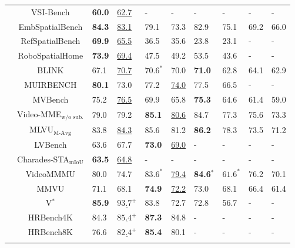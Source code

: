 {\begin{table}[htp]
\begin{adjustbox}{max width=1\textwidth}
\begin{NiceTabular}{c|c|w{c}{1cm}w{c}{1cm}|w{c}{1cm}w{c}{1cm}|w{c}{1cm}w{c}{1cm}|w{c}{1cm}w{c}{1cm}}
&VSI-Bench  & \textbf{60.0} & \underline{62.7} & - & - & - & - & - & - \\
&EmbSpatialBench & \textbf{84.3} & \underline{83.1} & 79.1 & 73.3 & 82.9 & 75.1 & 69.2 & 66.0 \\
&RefSpatialBench & \textbf{69.9} & \underline{65.5} & 36.5 & 35.6 & 23.8 & 23.1 &  -   &  -   \\
&RoboSpatialHome & \textbf{73.9} & \underline{69.4} & 47.5 & 49.2 & 53.5 & 43.6 &  -   &  -   \\
\midrule
{}
&BLINK & 67.1 & \underline{70.7} &  $70.6^*$ & 70.0 & \textbf{71.0} & 62.8 &  64.1   &  62.9   \\  
&MUIRBENCH & \textbf{80.1} & 73.0 &  77.2 & \underline{74.0} & 77.5 & 66.5 &  -   &  -   \\  
\midrule
{}
&MVBench                        & 75.2 & \underline{76.5} & 69.9 & 65.8 & \textbf{75.3} & 64.6 & 61.4 & 59.0 \\
&Video-MME$_{\text{w/o sub.}}$  & 79.0 & 79.2 & \textbf{85.1} & \underline{80.6} & 84.7 & 77.3 & 75.6 & 73.3 \\
&MLVU$_{\text{M-Avg}}$          & 83.8 & \underline{84.3} & 85.6 & 81.2 & \textbf{86.2} & 78.3 & 73.5 & 71.2 \\
&LVBench                        & 63.6 & 67.7 & \textbf{73.0} & \underline{69.0} &  -   &  -   &  -   &  -   \\
&Charades-STA$_{\text{mIoU}}$   & \textbf{63.5} & \underline{64.8} &  -   &   -  &  -   &  -   &  -   &  -   \\
&VideoMMMU                      & 80.0 & 74.7 & $83.6^*$ & \underline{79.4} & \textbf{84.6}$^*$ & $61.6^*$ & 76.2 & 70.1 \\
&MMVU                      & 71.1 & 68.1 & \textbf{74.9} & \underline{72.2} & 73.0 & 68.1 & 66.4 & 61.4 \\
\midrule
{} 
&V$^*$ & \textbf{85.9} &$\underline{93.7^{+}}$ & 83.8 & 72.7 & 72.8 & 56.7 &  -   &  -   \\
&HRBench4K  & 84.3 &$\underline{85.4^{+}}$ &  \textbf{87.3} & 84.8 & - & - & - & - \\
&HRBench8K & 76.6 &$\underline{82.4^{+}}$ & \textbf{85.4} & 80.1 & - & - & - & - \\
\midrule
{}

\end{NiceTabular}
\end{adjustbox}
\end{table}}
